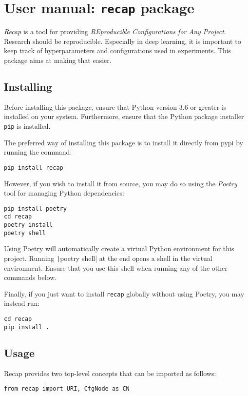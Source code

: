 \documentclass[../../report.tex]{subfiles}
\begin{document}
\chapter{User manual: \texttt{recap} package}
\label{chap:user_man_recap}

\emph{Recap} is a tool for providing \emph{REproducible Configurations for Any Project}.
Research should be reproducible.
Especially in deep learning, it is important to keep track of hyperparameters and configurations used in experiments.
This package aims at making that easier.

\section{Installing}
\label{sec:recap_installation}
Before installing this package, ensure that Python version 3.6 or greater is installed on your system.
Furthermore, ensure that the Python package installer \texttt{pip} is installed.

The preferred way of installing this package is to install it directly from \gls{pypi} by running the command:
\begin{verbatim}
pip install recap
\end{verbatim}

However, if you wish to install it from source, you may do so using the \emph{Poetry} tool for managing Python dependencies:
\begin{verbatim}
pip install poetry
cd recap
poetry install
poetry shell
\end{verbatim}
Using Poetry will automatically create a virtual Python environment for this project.
Running \texttt|poetry shell| at the end opens a shell in the virtual environment. 
Ensure that you use this shell when running any of the other commands below.

Finally, if you just want to install \texttt{recap} globally without using Poetry, you may instead run:
\begin{verbatim}
cd recap
pip install .
\end{verbatim}

\section{Usage}
Recap provides two top-level concepts that can be imported as follows:
\begin{verbatim}
from recap import URI, CfgNode as CN
\end{verbatim}
\end{document}
